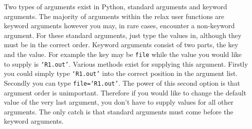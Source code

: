 \documentclass[a4paper, 11pt, twoside, openright]{book}
\begin{document}
Two types of arguments exist in Python, standard arguments and keyword arguments.  The majority of arguments within the relax user functions are keyword arguments however you may, in rare cases, encounter a non-keyword argument.  For these standard arguments, just type the values in, although they must be in the correct order.  Keyword arguments consist of two parts, the key and the value.  For example the key may be \texttt{file} while the value you would like to supply is \texttt{`R1.out'}.  Various methods exist for supplying this argument.  Firstly you could simply type \texttt{`R1.out'} into the correct position in the argument list.  Secondly you can type \texttt{file=`R1.out'}.  The power of this second option is that argument order is unimportant.  Therefore if you would like to change the default value of the very last argument, you don't have to supply values for all other arguments.  The only catch is that standard arguments must come before the keyword arguments.


\setlength{\parindent}{0pt}
\setlength{\parskip}{2ex plus 0.5ex minus 0.2ex}






\end{document}
